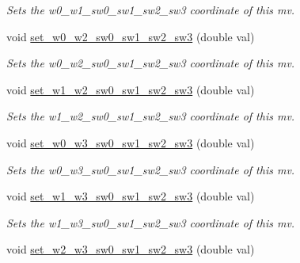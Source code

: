 \begin{DoxyCompactItemize}
\begin{DoxyCompactList}\small\item\em Sets the w0\-\_\-w1\-\_\-sw0\-\_\-sw1\-\_\-sw2\-\_\-sw3 coordinate of this mv. \end{DoxyCompactList}\item 
\hypertarget{classe3ga_1_1mv_ac805ca417bbddadc4315f58173e7577d}{void \hyperlink{classe3ga_1_1mv_ac805ca417bbddadc4315f58173e7577d}{set\-\_\-w0\-\_\-w2\-\_\-sw0\-\_\-sw1\-\_\-sw2\-\_\-sw3} (double val)}\label{classe3ga_1_1mv_ac805ca417bbddadc4315f58173e7577d}

\begin{DoxyCompactList}\small\item\em Sets the w0\-\_\-w2\-\_\-sw0\-\_\-sw1\-\_\-sw2\-\_\-sw3 coordinate of this mv. \end{DoxyCompactList}\item 
\hypertarget{classe3ga_1_1mv_a4046d098018e8d90541ef452936f7942}{void \hyperlink{classe3ga_1_1mv_a4046d098018e8d90541ef452936f7942}{set\-\_\-w1\-\_\-w2\-\_\-sw0\-\_\-sw1\-\_\-sw2\-\_\-sw3} (double val)}\label{classe3ga_1_1mv_a4046d098018e8d90541ef452936f7942}

\begin{DoxyCompactList}\small\item\em Sets the w1\-\_\-w2\-\_\-sw0\-\_\-sw1\-\_\-sw2\-\_\-sw3 coordinate of this mv. \end{DoxyCompactList}\item 
\hypertarget{classe3ga_1_1mv_a6a1eb741f48b26ca50771719f9db5147}{void \hyperlink{classe3ga_1_1mv_a6a1eb741f48b26ca50771719f9db5147}{set\-\_\-w0\-\_\-w3\-\_\-sw0\-\_\-sw1\-\_\-sw2\-\_\-sw3} (double val)}\label{classe3ga_1_1mv_a6a1eb741f48b26ca50771719f9db5147}

\begin{DoxyCompactList}\small\item\em Sets the w0\-\_\-w3\-\_\-sw0\-\_\-sw1\-\_\-sw2\-\_\-sw3 coordinate of this mv. \end{DoxyCompactList}\item 
\hypertarget{classe3ga_1_1mv_a9582422befbc9aabb9ebdc560c0781de}{void \hyperlink{classe3ga_1_1mv_a9582422befbc9aabb9ebdc560c0781de}{set\-\_\-w1\-\_\-w3\-\_\-sw0\-\_\-sw1\-\_\-sw2\-\_\-sw3} (double val)}\label{classe3ga_1_1mv_a9582422befbc9aabb9ebdc560c0781de}

\begin{DoxyCompactList}\small\item\em Sets the w1\-\_\-w3\-\_\-sw0\-\_\-sw1\-\_\-sw2\-\_\-sw3 coordinate of this mv. \end{DoxyCompactList}\item 
\hypertarget{classe3ga_1_1mv_a556282ca81cbcc57757ca7fc13ff82cc}{void \hyperlink{classe3ga_1_1mv_a556282ca81cbcc57757ca7fc13ff82cc}{set\-\_\-w2\-\_\-w3\-\_\-sw0\-\_\-sw1\-\_\-sw2\-\_\-sw3} (double val)}\label{classe3ga_1_1mv_a556282ca81cbcc57757ca7fc13ff82cc}


\end{DoxyCompactItemize}
